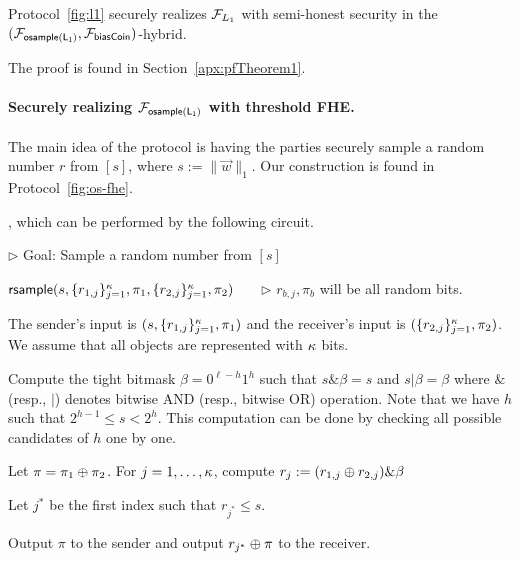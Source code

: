 \begin{theorem} \label{th:l1}
Protocol~\ref{fig:l1} securely realizes $\mathcal{F}_{L_1}$ with semi-honest
security in the $(\mathcal{F}_{\mathsf{osample(L_1)}}, \mathcal{F}_{\mathsf{biasCoin}})$-hybrid.
\end{theorem} 
The proof is found in Section~\ref{apx:pfTheorem1}.


\paragraph{Securely realizing $\mathcal{F}_{\mathsf{osample(L_1)}}$ with threshold FHE.}
%
The main idea of the protocol is having the parties securely sample a
random number $r$ from $[s]$, where $s := \| \vec{w} \|_1$. Our construction is found in
Protocol~\ref{fig:os-fhe}.

\iffalse
, which can be performed by the following
circuit.

\bbox
{
\BEN
\item[] \hspace{-2em} $\rhd$ Goal: Sample a random number from $[s]$
\item[] \hspace{-2em} ${\mathsf{rsample}}( s, \{r_{1,j}\}_{j=1}^\kappa, \pi_1, \{r_{2,j}\}_{j=1}^\kappa, \pi_2)$   ~~~$\rhd$ $r_{b,j}, \pi_b$ will
be all random bits. 

\item The sender's input is $(s, \{r_{1,j}\}_{j=1}^\kappa, \pi_1)$
and the receiver's input is $(\{r_{2,j}\}_{j=1}^\kappa, \pi_2)$.\\ We
assume that  all objects are represented with $\kappa$ bits.

\item Compute the tight bitmask $\beta = 0^{\ell-h}1^h$ such that $s \& \beta = s$ and $s
| \beta = \beta$ where $\&$ (resp., $|$) denotes bitwise AND (resp.,
bitwise OR) operation. Note that we have $h$ such that $2^{h-1} \le s <
2^h$. This computation can be done by checking all possible candidates
of $h$ one by one.

\item Let $\pi = \pi_1 \oplus \pi_2$. For $j=1, \ldots, \kappa$, compute $r_j := (r_{1,j} \oplus r_{2,j}) \& \beta$
\item Let $j^*$ be the first index such that $r_{j^*} \le s$. 
\item Output $\pi$ to the sender and output $r_{j^*} \oplus \pi$ to the receiver.
\EEN
}

